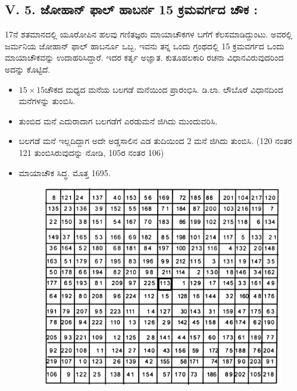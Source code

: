 \subsection*{V. 5. ಜೋಹಾನ್ ಫಾಲ್ ಹಾಬರ್ನ 15 ಕ್ರಮವರ್ಗದ ಚೌಕ :}

17ನೆ ಶತಮಾನದಲ್ಲಿ ಯೂರೋಪಿನ ಹಲವು ಗಣಿತಜ್ಞರು ಮಾಯಾಚೌಕಗಳ ಬಗೆಗೆ ಕೆಲಸ\break ಮಾಡಿದ್ದುಂಟು. ಅವರಲ್ಲಿ ಜರ್ಮನಿಯ ಜೋಹಾನ್ ಫಾಲ್ ಹಾಬರ್ನೂ ಒಬ್ಬ. ಇವನು ತನ್ನ ಒಂದು ಗ್ರಂಥದಲ್ಲಿ 15 ಕ್ರಮವರ್ಗದ ಒಂದು ಮಾಯಾಚೌಕವನ್ನು ಉದಾಹರಿಸಿದ್ದಾರೆ. ಇದರ ಕರ್ತೃ ಅಜ್ಞಾತ. ಕುತೂಹಲಕಾರಿ ರಚನಾ ವಿಧಾನವಿರುವುದರಿಂದ ಅದನ್ನು ಕೊಟ್ಟಿದೆ.
\begin{itemize}
	\item $15 \times 15$ಚೌಕದ ಮಧ್ಯದ ಮನೆಯ ಬಲಗಡೆ ಮನೆಯಿಂದ ಪ್ರಾರಂಭಿಸಿ. ಡಿ.ಲಾ. ಲೌಬೊರೆ ವಿಧಾನದಿಂದ ಮನೆಗಳನ್ನು ತುಂಬಿಸಿ.
	\item ತುಂಬಿದ ಮನೆ ಎದುರಾದಾಗ ಬಲಗಡೆಗೆ ಎರಡುಮನೆ ಜಿಗಿದು ಮುಂದುವರಿಸಿ.
	\item ಬಲಗಡೆ ಮನೆ ಇಲ್ಲದಿದ್ದಾಗ ಅದೇ ಅಡ್ಡಸಾಲಿನ ಎಡ ತುದಿಯಿಂದ 2 ಮನೆ ಜಿಗಿದು ತುಂಬಿಸಿ. (120 ನಂತರ 121 ತುಂಬಿಸಿರುವುದನ್ನು ನೋಡಿ, 105ರ ನಂತರ 106)
	\item ಮಾಯಾಚೌಕ ಸಿದ್ಧ. ಮೊತ್ತ 1695.
	\begin{figure}[H]
	\includegraphics[scale=0.8]{src/figures/chap4/fig4.23.jpg}
	\end{figure}
\end{itemize}





